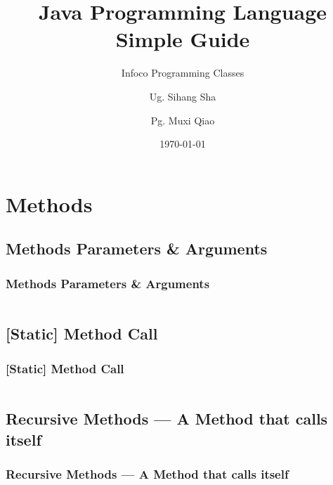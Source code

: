 \documentclass[en, 11pt, xcolor=dvipsnames]{beamer}
\title{Java Programming Language \\ Simple Guide} %
\subtitle{Infoco Programming Classes} %
\author{Ug. Sihang Sha \and Pg. Muxi Qiao} %
\institute{Xiann' Jiaotong Livepool University \\ \smallskip \textit{infoco@xjtlu.edu.cn}} %
\date{\today} %
\begin{document}
\maketitle

\section{Methods}
\subsection{Methods Parameters \& Arguments}
\begin{frame}[fragile]
	\frametitle{Methods Parameters \& Arguments}

	\begin{columns}
		\begin{column}{0.98\textwidth}

		\end{column}
	\end{columns}

\end{frame}

\subsection{[Static] Method Call}
\begin{frame}[fragile]
	\frametitle{[Static] Method Call}

	\begin{columns}
		\begin{column}{0.98\textwidth}

		\end{column}
	\end{columns}

\end{frame}

\subsection{Recursive Methods --- A Method that calls itself}
\begin{frame}[fragile]
	\frametitle{Recursive Methods --- A Method that calls itself}

	\begin{columns}
		\begin{column}{0.98\textwidth}

		\end{column}
	\end{columns}

\end{frame}
\end{document}
